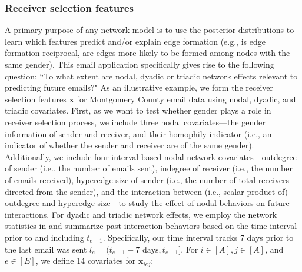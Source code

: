 \documentclass[ba]{imsart}
\numberwithin{equation}{section}
\theoremstyle{plain}
\begin{document}
	\subsubsection{Receiver selection features}
	A primary purpose of any network model is to use the posterior distributions to learn which features predict and/or explain edge formation (e.g., is edge formation reciprocal, are edges more likely to be formed among nodes with the same gender). This email application specifically gives rise to the following question: ``To what extent are nodal, dyadic or triadic network effects relevant to predicting future emails?" As an illustrative example, we form the receiver selection features $\boldsymbol{x}$ for Montgomery County email data using nodal, dyadic, and triadic covariates. First, as we want to test whether gender plays a role in receiver selection process, we include three nodal covariates---the gender information of sender and receiver, and their homophily indicator (i.e., an indicator of whether the sender and receiver are of the same gender).  Additionally, we include four interval-based nodal network covariates---outdegree of sender (i.e., the number of emails sent), indegree of receiver (i.e., the number of emails received), hyperedge size of sender (i.e., the number of total receivers directed from the sender), and the interaction between (i.e., scalar product of) outdegree and hyperedge size---to study the effect of nodal behaviors on future interactions. For dyadic and triadic network effects, we employ the network statistics in \cite{PerryWolfe2012} and summarize past interaction behaviors based on the time interval prior to and including $t_{e-1}$. Specifically, our time interval tracks 7 days prior to the last email was sent $l_e= (t_{e-1}-7\mbox{ days}, t_{e-1}]$. For $i \in [A], j\in [A]$, and $e \in [E]$, we define 14 covariates for $\boldsymbol{x}_{iej}$:
\end{document}
